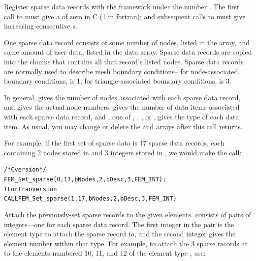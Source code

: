 
Register  sparse data records with the framework under the number . 
The first call to  must give a  of zero in C (1 in fortran);
and subsequent calls to  must give increasing consecutive s.

One sparse data record consists of some number of nodes, listed in the
 array, and some amount of user data, listed in the data array.
Sparse data records are copied into the chunks that contains all that record's listed 
nodes.  Sparse data records are normally used to describe mesh boundary conditions--
for node-associated boundary conditions,  is 1; for triangle-associated
boundary conditions,  is 3.

In general,  gives the number of nodes associated with each
sparse data record, and  gives the actual node numbers.
 gives the number of data items associated with each sparse 
data record, and , one of , ,
, or , gives the type of each data item.
As usual, you may change or delete the  and  arrays after this
call returns.

For example, if the first set of sparse data is 17 sparse data records, each 
containing 2 nodes stored in  and 3 integers stored in , 
we would make the call:
\begin{alltt}
/*C version*/
  FEM\_Set\_sparse(0,17, bNodes,2, bDesc,3,FEM\_INT);
! Fortran version
  CALL FEM\_Set\_sparse(1,17, bNodes,2, bDesc,3,FEM\_INT)
\end{alltt}


Attach the previously-set sparse records  to the given elements.
 consists of pairs of integers---one for each sparse data record.
The first integer in the pair is the
element type to attach the sparse record to, and the second integer
gives the element number within that type.  For example, to attach
the 3 sparse records at  to the elements numbered 10, 11, and 12
of the element type , use:


